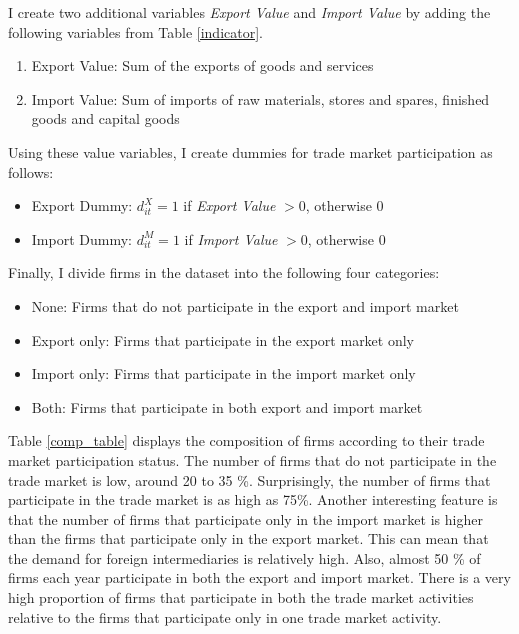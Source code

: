\documentclass[12pt]{article}
\begin{document}
I create two additional variables \textit{Export Value} and
\textit{Import Value}
by adding the following variables from Table \ref{indicator}.  
\begin{enumerate}
\item Export Value: Sum of the exports of goods and services 
\item Import Value: Sum of imports of raw materials, stores and spares,
  finished goods and capital goods 
\end{enumerate}
Using these value variables, I create dummies for trade market
participation as follows:
\begin{itemize}
\item Export Dummy: $d_{it}^{X}=1$ if \textit{Export Value} $> 0$,
  otherwise $0$
\item Import Dummy: $d_{it}^{M}=1$ if \textit{Import Value} $> 0$, otherwise $0$
\end{itemize} 

Finally, I divide firms in the dataset into the following four categories:
\begin{itemize}
\item None: Firms that do not participate in the export and import
  market 
\item Export only: Firms that participate in the export market only
\item Import only: Firms that participate in the import market only
\item Both: Firms that participate in both export and import market
\end{itemize}

Table \ref{comp_table} displays the composition of firms according to their trade market
participation status. The number of firms that do not
participate in the trade market is low, around 20 to 35
\%. Surprisingly, the number of firms that participate in the trade
market is as high as 75\%. Another interesting feature is that the number
of firms that participate only in the import market is higher than the
firms that participate only in the export market. This can mean that
the demand for foreign intermediaries is relatively high. Also, almost 50 \% of
firms each year participate in both the export and import market. There is
a very high proportion of firms that participate in both the trade market activities relative to the firms that
participate only in one trade market activity. 
\end{document}

